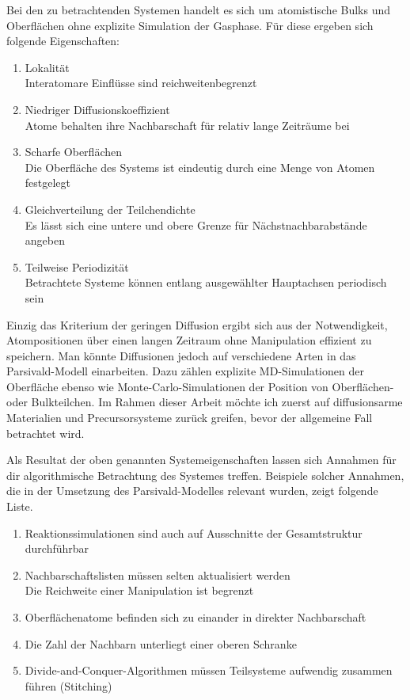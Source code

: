 Bei den zu betrachtenden Systemen handelt es sich um atomistische Bulks und Oberflächen ohne explizite Simulation der Gasphase.
Für diese ergeben sich folgende Eigenschaften:
\begin{enumerate}
\item Lokalität\\
  Interatomare Einflüsse sind reichweitenbegrenzt
\item Niedriger Diffusionskoeffizient\\
  Atome behalten ihre Nachbarschaft für relativ lange Zeiträume bei
\item Scharfe Oberflächen\\
  Die Oberfläche des Systems ist eindeutig durch eine Menge von Atomen festgelegt
\item Gleichverteilung der Teilchendichte\\
  Es lässt sich eine untere und obere Grenze für Nächstnachbarabstände angeben
\item Teilweise Periodizität\\
  Betrachtete Systeme können entlang ausgewählter Hauptachsen periodisch sein
\end{enumerate}

Einzig das Kriterium der geringen Diffusion ergibt sich aus der Notwendigkeit, Atompositionen über einen langen Zeitraum ohne Manipulation effizient zu speichern.
Man könnte Diffusionen jedoch auf verschiedene Arten in das Parsivald-Modell einarbeiten.
Dazu zählen explizite MD-Simulationen der Oberfläche ebenso wie Monte-Carlo-Simulationen der Position von Oberflächen- oder Bulkteilchen.
Im Rahmen dieser Arbeit möchte ich zuerst auf diffusionsarme Materialien und Precursorsysteme zurück greifen, bevor der allgemeine Fall betrachtet wird.

Als Resultat der oben genannten Systemeigenschaften lassen sich Annahmen für dir algorithmische Betrachtung des Systemes treffen.
Beispiele solcher Annahmen, die in der Umsetzung des Parsivald-Modelles relevant wurden, zeigt folgende Liste.

\begin{enumerate}
\item Reaktionssimulationen sind auch auf Ausschnitte der Gesamtstruktur durchführbar
\item Nachbarschaftslisten müssen selten aktualisiert werden\\
  Die Reichweite einer Manipulation ist begrenzt
\item Oberflächenatome befinden sich zu einander in direkter Nachbarschaft
\item Die Zahl der Nachbarn unterliegt einer oberen Schranke
\item Divide-and-Conquer-Algorithmen müssen Teilsysteme aufwendig zusammen führen (Stitching)
\end{enumerate}

